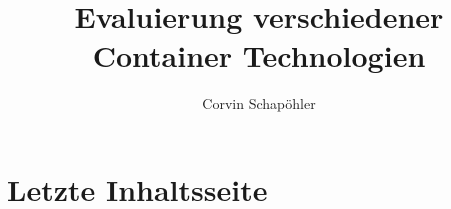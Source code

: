 

\title{Evaluierung verschiedener Container Technologien}
\author{Corvin Schapöhler}


	
	
	
	\frontmatter
	
%	
	

	\setcounter{tocdepth}{1}
	\tableofcontents

	\mainmatter
	\pagestyle{main}
	
	
	\chapter{Letzte Inhaltsseite}
	
	\backmatter
	
	
